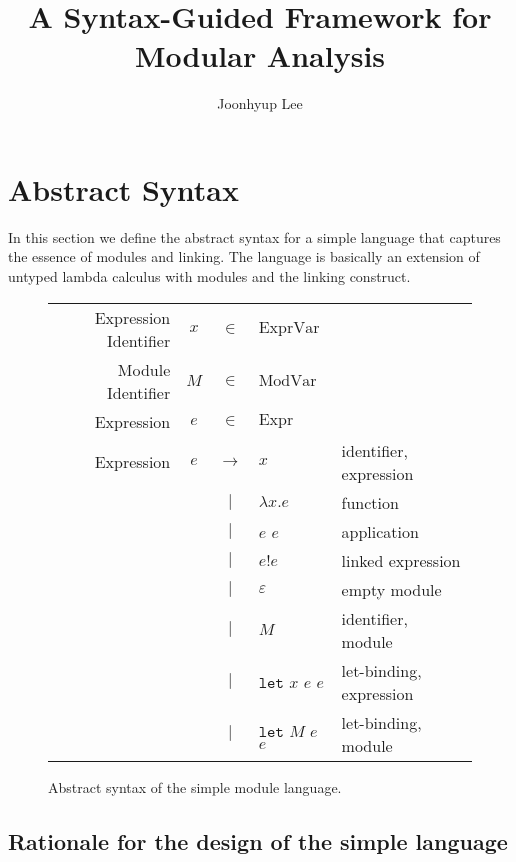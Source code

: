 \documentclass[acmsmall,review]{acmart}\settopmatter{printfolios=true,printccs=false,printacmref=false}
\title{A Syntax-Guided Framework for Modular Analysis}
\author{Joonhyup Lee}
\theoremstyle{definition}
\newcommand*{\vbar}{|}
\newcommand*{\Expr}{\text{Expr}}
\newcommand*{\ExprVar}{\text{ExprVar}}
\newcommand*{\ModVar}{\text{ModVar}}
\newcommand*{\link}[2]{{#1}\mathtt{!}{#2}}
\newcommand*{\Let}{\mathtt{let}}
\begin{document}
\maketitle

\section{Abstract Syntax}

In this section we define the abstract syntax for a simple language that captures the essence of modules and linking.
The language is basically an extension of untyped lambda calculus with modules and the linking construct.

\begin{figure}[htb]
  \centering
  \footnotesize
  \begin{tabular}{rccll}
    Expression Identifier & $x$ & $\in$         & $\ExprVar$                                   \\
    Module Identifier     & $M$ & $\in$         & $\ModVar$                                    \\
    Expression            & $e$ & $\in$         & $\Expr$                                      \\
    Expression            & $e$ & $\rightarrow$ & $x$                & identifier, expression  \\
                          &     & $\vbar$       & $\lambda x.e$      & function                \\
                          &     & $\vbar$       & $e$ $e$            & application             \\
                          &     & $\vbar$       & $\link{e}{e}$      & linked expression       \\
                          &     & $\vbar$       & $\varepsilon$      & empty module            \\
                          &     & $\vbar$       & $M$                & identifier, module      \\
                          &     & $\vbar$       & $\Let$ $x$ $e$ $e$ & let-binding, expression \\
                          &     & $\vbar$       & $\Let$ $M$ $e$ $e$ & let-binding, module     \\
  \end{tabular}
  \caption{Abstract syntax of the simple module language.}
\end{figure}
\subsection{Rationale for the design of the simple language}
\end{document}
